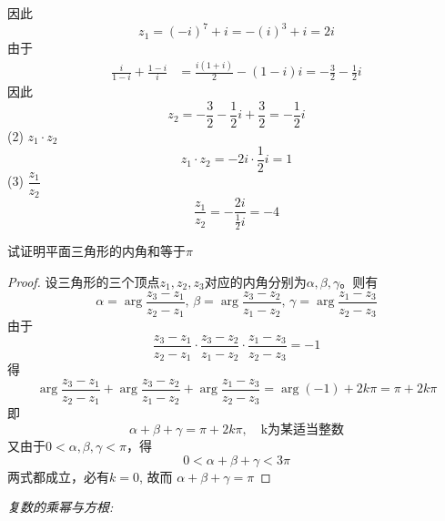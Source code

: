因此
\[ z_1 = (-i)^7 + i = -(i)^3 + i = 2 i\]
由于
\[ \begin{aligned}
    \frac{i}{1-i} + \frac{1-i}{i} &= \frac{i(1+i)}{2} - (1-i)i  = - \frac{3}{2} - \frac{1}{2} i 
\end{aligned}\]
因此 
\[     z_2 = - \frac{3}{2} - \frac{1}{2} i  + \frac{3}{2} = - \frac{1}{2} i\]
(2) $z_1 \cdot z_2 $
\[ z_1 \cdot z_2 = - 2 i \cdot  \frac{1}{2} i =  1 \]
(3) $\dfrac{z_1}{z_2}$
\[ \frac{z_1}{z_2} = - \frac{2 i}{\frac{1}{2} i} = -4 \]
\begin{example}
    试证明平面三角形的内角和等于$\pi$
\end{example}
\begin{proof}
设三角形的三个顶点$z_1, z_2, z_3$对应的内角分别为$\alpha, \beta, \gamma$。则有
\[\alpha = \arg \frac{z_3-z_1}{z_2- z_1}, \, \beta = \arg \frac{z_3-z_2}{z_1- z_2}, \, \gamma = \arg \frac{z_1-z_3}{z_2- z_3}\] 
由于 
\[ \frac{z_3-z_1}{z_2- z_1} \cdot \frac{z_3-z_2}{z_1- z_2} \cdot \frac{z_1-z_3}{z_2- z_3} = -1\]
得
\[\arg \frac{z_3-z_1}{z_2- z_1} + \arg \frac{z_3-z_2}{z_1- z_2} + \arg \frac{z_1-z_3}{z_2- z_3} = \arg(-1) + 2 k \pi = \pi + 2 k \pi\] 
即  \[ \alpha + \beta + \gamma =  \pi + 2 k \pi, \quad \text{k为某适当整数}\] 
又由于$ 0< \alpha,  \beta, \gamma < \pi $，得
\[ 0< \alpha + \beta + \gamma < 3 \pi \]  
两式都成立，必有$k = 0 $, 故而 $\alpha + \beta + \gamma = \pi$
\end{proof}

\noindent \emph{复数的乘幂与方根: }

